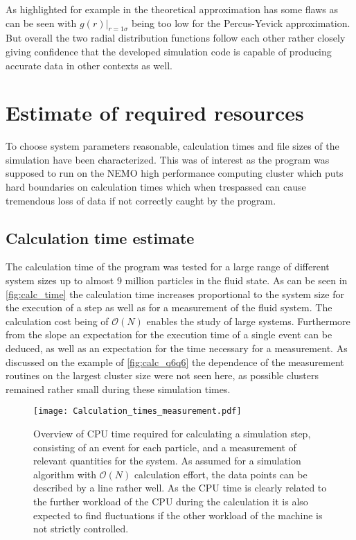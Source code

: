 As highlighted for example in \cite{Hansen2006} the theoretical approximation has some flaws as can be seen with $g(r)|_{r=1\sigma}$ being too low for the Percus-Yevick approximation. But overall the two radial distribution functions follow each other rather closely giving confidence that the developed simulation code is capable of producing accurate data in other contexts as well.\\

\section{Estimate of required resources}
\label{sec:resources}
To choose system parameters reasonable, calculation times and file sizes of the simulation have been characterized. This was of interest as the program was supposed to run on the NEMO high performance computing cluster which puts hard boundaries on calculation times which when trespassed can cause tremendous loss of data if not correctly caught by the program.\\
 
\subsection{Calculation time estimate}
\label{sec:calc_times}
The calculation time of the program was tested for a large range of different system sizes up to almost 9 million particles in the fluid state. As can be seen in \autoref{fig:calc_time} the calculation time increases proportional to the system size for the execution of a step as well as for a measurement of the fluid system. The calculation cost being of $\mathcal{O}(N)$ enables the study of large systems. Furthermore from the slope an expectation for the execution time of a single event can be deduced, as well as an expectation for the time necessary for a measurement. As discussed on the example of \autoref{fig:calc_q6q6} the dependence of the measurement routines on the largest cluster size were not seen here, as possible clusters remained rather small during these simulation times.\\

\begin{figure}[h!]
\centering
\texttt{[image: Calculation\_times\_measurement.pdf]}
\caption[Calculation time estimate]{Overview of CPU time required for calculating a simulation step, consisting of an event for each particle, and a measurement of relevant quantities for the system. As assumed for a simulation algorithm with $\mathcal{O}(N)$ calculation effort, the data points can be described by a line rather well. As the CPU time is clearly related to the further workload of the CPU during the calculation it is also expected to find fluctuations if the other workload of the machine is not strictly controlled.}
\label{fig:calc_time}
\end{figure}

